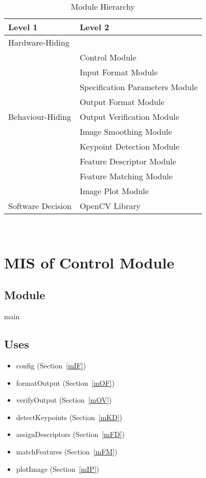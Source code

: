 \documentclass[12pt, titlepage]{article}
\begin{document}
\begin{table}[h!]
\centering
\begin{tabular}{p{} p{}}
\toprule
\textbf{Level 1} & \textbf{Level 2}\\
\midrule

{Hardware-Hiding} & ~ \\
\midrule

\multirow{9}{0.3\textwidth}{Behaviour-Hiding} & Control Module\\
& Input Format Module \\
& Specification Parameters Module \\
& Output Format Module \\
& Output Verification Module \\
& Image Smoothing Module \\
& Keypoint Detection Module \\
& Feature Descriptor Module \\
& Feature Matching Module \\
& Image Plot Module \\
\midrule

\multirow{5}{0.3\textwidth}{Software Decision} & OpenCV Library \\
\bottomrule
 
\end{tabular}
\caption{Module Hierarchy}
\label{TblMH}
\end{table}

\newpage
~\newpage
\section{MIS of Control Module} \label{mC}
\subsection{Module}
main

\subsection{Uses}
\begin{itemize}
  \item config (Section~\ref{mIF})
  \item formatOutput (Section~\ref{mOF})
  \item verifyOutput (Section~\ref{mOV})
  \item detectKeypoints (Section~\ref{mKD})
  \item assignDescriptors (Section~\ref{mFD})
  \item matchFeatures (Section~\ref{mFM})
  \item plotImage (Section~\ref{mIP})

\end{itemize}
\end{document}
